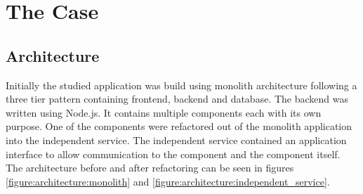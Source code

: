\chapter{The Case\label{case}}

\section{Architecture}
Initially the studied application was build using monolith architecture following a three tier pattern containing frontend, backend and database.
The backend was written using Node.js.
It contains multiple components each with its own purpose.
One of the components were refactored out of the monolith application into the independent service.
The independent service contained an application interface to allow communication to the component and the component itself.
The architecture before and after refactoring can be seen in figures \ref{figure:architecture:monolith} and \ref{figure:architecture:independent_service}.



